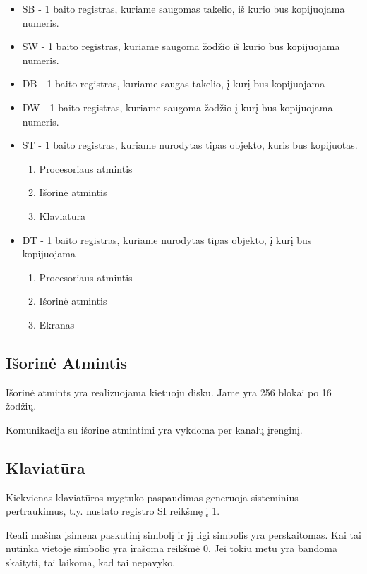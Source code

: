 \documentclass{VUMIFInfKursinis}
\begin{document}
\begin{itemize}
	\item SB - 1 baito registras, kuriame saugomas takelio, iš kurio bus kopijuojama numeris.
	\item SW - 1 baito registras, kuriame saugoma žodžio iš kurio bus kopijuojama numeris.
	\item DB - 1 baito registras, kuriame saugas takelio, į kurį bus kopijuojama
	\item DW - 1 baito registras, kuriame saugoma žodžio į kurį  bus kopijuojama numeris.
	\item ST - 1 baito registras, kuriame nurodytas tipas objekto, kuris bus kopijuotas. 
	\begin{enumerate}
		\item Procesoriaus atmintis
		\item Išorinė atmintis
		\item Klaviatūra
	\end{enumerate}
	\item DT - 1 baito registras, kuriame nurodytas tipas objekto, į kurį bus kopijuojama
	\begin{enumerate}
		\item Procesoriaus atmintis
		\item Išorinė atmintis
		\item Ekranas
	\end{enumerate}
\end{itemize}

\subsection{Išorinė Atmintis}

Išorinė atmints yra realizuojama kietuoju disku. Jame yra 256 blokai po 16 žodžių.

Komunikacija su išorine atmintimi yra vykdoma per kanalų įrenginį.

\subsection{Klaviatūra}

Kiekvienas klaviatūros mygtuko paspaudimas generuoja sisteminius pertraukimus, t.y. nustato registro SI reikšmę į 1. 

Reali mašina įsimena paskutinį simbolį ir jį ligi simbolis yra perskaitomas. Kai tai nutinka vietoje simbolio yra įrašoma reikšmė 0. Jei tokiu metu yra bandoma skaityti, tai laikoma, kad tai nepavyko.
\end{document}
